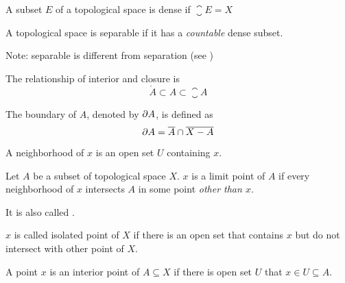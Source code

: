 \begin{definition}
    A subset $E$ of a topological space is dense if $\closure{E} = X$
\end{definition}

\begin{definition}\label{separable}
    A topological space is separable if it has a \emph{countable} dense subset.
    
    Note: separable is different from separation (see )
\end{definition}



\begin{theorem}
    The relationship of interior and closure is
\begin{equation}
    \mathring{A} \subset A \subset \closure{A}
\end{equation}
\end{theorem}



\begin{definition}
    The boundary of $A$, denoted by $\partial A$, is defined as
    \begin{equation}
        \partial A = \overline{A} \cap \overline{X - A}
    \end{equation}
\end{definition}


\begin{definition}
    A neighborhood of $x$ is an open set $U$ containing $x$.
\end{definition}


\begin{definition}
    Let $A$ be a subset of topological space $X$. $x$ is a limit point of $A$ if every neighborhood of $x$ intersects $A$ in some point \emph{other than $x$}.
    
    It is also called .
\end{definition}

\begin{definition}
    $x$ is called isolated point of $X$ if there is an open set that contains $x$ but do not intersect with other point of $X$.
\end{definition}

\begin{definition}
    A point $x$ is an interior point of $A \subseteq X$ if there is open set $U$ that $x \in U \subseteq A$.
\end{definition}


